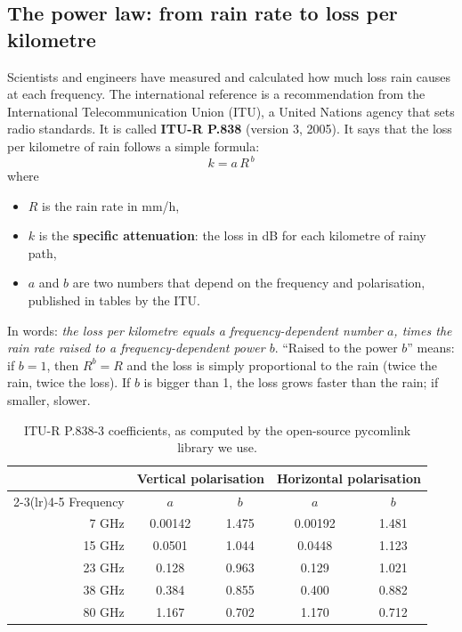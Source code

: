\documentclass[11pt,a4paper]{article}
\begin{document}
\subsection{The power law: from rain rate to loss per kilometre}

Scientists and engineers have measured and calculated how much loss rain causes at each frequency.
The international reference is a recommendation from the International Telecommunication Union
(ITU), a United Nations agency that sets radio standards. It is called \textbf{ITU-R P.838}
(version 3, 2005). It says that the loss per kilometre of rain follows a simple formula:
\begin{equation}
k = a \, R^{\,b}
\label{eq:kR}
\end{equation}
where
\begin{itemize}
\item $R$ is the rain rate in mm/h,
\item $k$ is the \textbf{specific attenuation}: the loss in dB for each kilometre of rainy path,
\item $a$ and $b$ are two numbers that depend on the frequency and polarisation, published in tables by the ITU.
\end{itemize}
In words: \emph{the loss per kilometre equals a frequency-dependent number $a$, times the rain rate raised to
a frequency-dependent power $b$}. ``Raised to the power $b$'' means: if $b=1$, then $R^b = R$ and the loss is
simply proportional to the rain (twice the rain, twice the loss). If $b$ is bigger than 1, the loss grows
faster than the rain; if smaller, slower.

\begin{table}[h]
\centering\small
\begin{tabular}{rcccc}
\toprule
& \multicolumn{2}{c}{Vertical polarisation} & \multicolumn{2}{c}{Horizontal polarisation} \\
\cmidrule(lr){2-3}\cmidrule(lr){4-5}
Frequency & $a$ & $b$ & $a$ & $b$ \\
\midrule
7 GHz  & 0.00142 & 1.475 & 0.00192 & 1.481 \\
15 GHz & 0.0501 & 1.044 & 0.0448 & 1.123 \\
23 GHz & 0.128 & 0.963 & 0.129 & 1.021 \\
38 GHz & 0.384 & 0.855 & 0.400 & 0.882 \\
80 GHz & 1.167 & 0.702 & 1.170 & 0.712 \\
\bottomrule
\end{tabular}
\caption{ITU-R P.838-3 coefficients, as computed by the open-source pycomlink library we use.}
\label{tab:ab}
\end{table}
\end{document}
